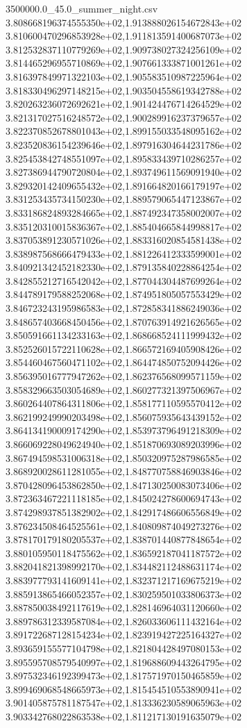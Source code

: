 \begin{filecontents*}{3500000.0_45.0_summer_night.csv}
3.808668196374555350e+02,1.913888026154672843e+02
3.810600470296853928e+02,1.911813591400687073e+02
3.812532837110779269e+02,1.909738027324256109e+02
3.814465296955710869e+02,1.907661333871001261e+02
3.816397849971322103e+02,1.905583510987225964e+02
3.818330496297148215e+02,1.903504558619342788e+02
3.820263236072692621e+02,1.901424476714264529e+02
3.821317027516248572e+02,1.900289916237379657e+02
3.822370852678801043e+02,1.899155033548095162e+02
3.823520836154239646e+02,1.897916304644231786e+02
3.825453842748551097e+02,1.895833439710286257e+02
3.827386944790720804e+02,1.893749611569091940e+02
3.829320142409655432e+02,1.891664820166179197e+02
3.831253435734150230e+02,1.889579065447123867e+02
3.833186824893284665e+02,1.887492347358002007e+02
3.835120310015836367e+02,1.885404665844998817e+02
3.837053891230571026e+02,1.883316020854581438e+02
3.838987568666479433e+02,1.881226412333599001e+02
3.840921342452182330e+02,1.879135840228864254e+02
3.842855212716542042e+02,1.877044304487699264e+02
3.844789179588252068e+02,1.874951805057553429e+02
3.846723243195986583e+02,1.872858341886249036e+02
3.848657403668450456e+02,1.870763914921626565e+02
3.850591661134233163e+02,1.868668524111999432e+02
3.852526015722110628e+02,1.866572169405908426e+02
3.854460467560471102e+02,1.864474850752094426e+02
3.856395016777947262e+02,1.862376568099571159e+02
3.858329663503054689e+02,1.860277321397506967e+02
3.860264407864311806e+02,1.858177110595570412e+02
3.862199249990203498e+02,1.856075935643439152e+02
3.864134190009174290e+02,1.853973796491218309e+02
3.866069228049624940e+02,1.851870693089203996e+02
3.867494598531006318e+02,1.850320975287986585e+02
3.868920028611281055e+02,1.848770758846903846e+02
3.870428096453862850e+02,1.847130250083073406e+02
3.872363467221118185e+02,1.845024278600694743e+02
3.874298937851382902e+02,1.842917486606556849e+02
3.876234508464525561e+02,1.840809874049273276e+02
3.878170179180205537e+02,1.838701440877848654e+02
3.880105950118475562e+02,1.836592187041187572e+02
3.882041821398992170e+02,1.834482112488631174e+02
3.883977793141609141e+02,1.832371217169675219e+02
3.885913865466052357e+02,1.830259501033806373e+02
3.887850038492117619e+02,1.828146964031120660e+02
3.889786312339587084e+02,1.826033606111432164e+02
3.891722687128154234e+02,1.823919427225164327e+02
3.893659155577104798e+02,1.821804428497080153e+02
3.895595708579540997e+02,1.819688609443264795e+02
3.897532346192399473e+02,1.817571970150465859e+02
3.899469068548665973e+02,1.815454510553890941e+02
3.901405875781187547e+02,1.813336230589065963e+02
3.903342768022863538e+02,1.811217130191635079e+02

\end{filecontents*}
